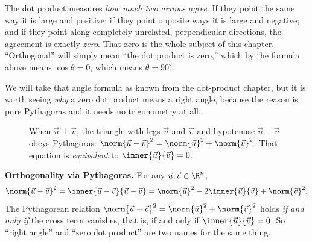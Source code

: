 \begin{intuitionbox}
The dot product measures \emph{how much two arrows agree}. If they point the same way it is large
and positive; if they point opposite ways it is large and negative; and if they point along
completely unrelated, perpendicular directions, the agreement is exactly \emph{zero}. That zero is
the whole subject of this chapter. ``Orthogonal'' will simply mean ``the dot product is zero,''
which by the formula above means $\cos\theta = 0$, which means $\theta = 90^\circ$.
\end{intuitionbox}

We will take that angle formula as known from the dot-product chapter, but it is worth seeing
\emph{why} a zero dot product means a right angle, because the reason is pure Pythagoras and it
needs no trigonometry at all.

\begin{figure}[H]
\centering
{}
\caption{When $\vec{u}\perp\vec{v}$, the triangle with legs $\vec{u}$ and $\vec{v}$ and
hypotenuse $\vec{u}-\vec{v}$ obeys Pythagoras: $\norm{\vec{u}-\vec{v}}^2=\norm{\vec{u}}^2+\norm{\vec{v}}^2$.
That equation is \emph{equivalent} to $\inner{\vec{u}}{\vec{v}}=0$.}
\label{ch17:pythagoras}
\end{figure}

\begin{formalbox}
\textbf{Orthogonality via Pythagoras.} For any $\vec{u},\vec{v}\in\R^n$,
\[
  \norm{\vec{u}-\vec{v}}^2
  = \inner{\vec{u}-\vec{v}}{\vec{u}-\vec{v}}
  = \norm{\vec{u}}^2 - 2\inner{\vec{u}}{\vec{v}} + \norm{\vec{v}}^2.
\]
The Pythagorean relation $\norm{\vec{u}-\vec{v}}^2 = \norm{\vec{u}}^2 + \norm{\vec{v}}^2$ holds
\emph{if and only if} the cross term vanishes, that is, if and only if
$\inner{\vec{u}}{\vec{v}}=0$. So ``right angle'' and ``zero dot product'' are two names for the
same thing.
\end{formalbox}


